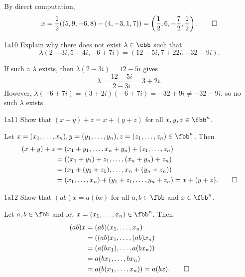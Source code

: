 \begin{sol}
    By direct computation,
    \[
        x = \frac{1}{2}((5, 9, -6, 8) - (4, -3, 1, 7)) = \left(\frac{1}{2}, 6, -\frac{7}{2}, \frac{1}{2}\right). \qedhere
    \]
\end{sol}

\begin{exercise}{1a10}
    Explain why there does not exist $\lambda \in \cbb$ such that
    \[
    	\lambda(2 - 3i, 5 + 4i, -6 + 7i) = (12 - 5i, 7 + 22i, -32 - 9i).
    \]
\end{exercise}

\begin{sol}
    If such a $\lambda$ exists, then $\lambda(2 - 3i) = 12 - 5i$ gives
    \[
        \lambda = \frac{12 - 5i}{2 - 3i} = 3 + 2i.
    \]
    However, $\lambda(-6 + 7i) = (3 + 2i)(-6 + 7i) = -32 + 9i \neq -32 - 9i$, so no such $\lambda$ exists.
\end{sol}

\begin{exercise}{1a11}
    Show that $(x + y) + z = x + (y + z)$ for all $x, y, z \in \fbb^n$.
\end{exercise}

\begin{sol}
    Let $x = (x_1, \dots, x_n), y = (y_1, \dots, y_n), z = (z_1, \dots, z_n) \in \fbb^n$.
    Then
    \begin{align*}
        (x + y) + z &= (x_1 + y_1, \dots, x_n + y_n) + (z_1, \dots, z_n) \\
        &= ((x_1 + y_1) + z_1, \dots, (x_n + y_n) + z_n) \\
        &= (x_1 + (y_1 + z_1), \dots, x_n + (y_n + z_n)) \\
        &= (x_1, \dots, x_n) + (y_1 + z_1, \dots, y_n + z_n) = x + (y + z). \qedhere
    \end{align*}
\end{sol}

\begin{exercise}{1a12}
    Show that $(ab)x = a(bx)$ for all $a, b \in \fbb$ and $x \in \fbb^n$.
\end{exercise}

\begin{sol}
    Let $a, b \in \fbb$ and let $x = (x_1, \dots, x_n) \in \fbb^n$.
    Then
    \begin{align*}
        (ab)x &= (ab)(x_1, \dots, x_n) \\
        &= ((ab)x_1, \dots, (ab)x_n) \\
        &= (a(bx_1), \dots, a(bx_n)) \\
        &= a(bx_1, \dots, bx_n) \\
        &= a(b(x_1, \dots, x_n)) = a(bx). \qedhere
    \end{align*}
\end{sol}

